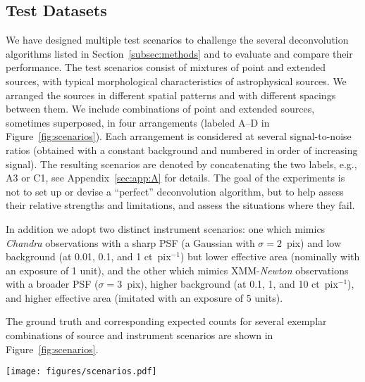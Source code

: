\documentclass[twocolumn, linenumbers]{aastex631}
\newcommand{\chandra}{\textit{Chandra}~}
\newcommand{\chandranospace}{\textit{Chandra}}
\newcommand{\xmm}{\textit{XMM}~}
\begin{document}
    \subsection{Test Datasets}
    \label{subsec:test-datasets}
    We have designed multiple test scenarios to challenge the several deconvolution algorithms listed in Section~\ref{subsec:methods} and to evaluate and compare their performance. The test scenarios consist of mixtures of point and extended sources, with typical morphological characteristics of astrophysical sources. We arranged the sources in different spatial patterns and with different spacings between them. We include combinations of point and extended sources, sometimes superposed, in four arrangements (labeled A--D in Figure~\ref{fig:scenarios}). Each arrangement is considered at several signal-to-noise ratios (obtained with a constant background and numbered in order of increasing signal). The resulting scenarios are denoted by concatenating the two labels, e.g., A3 or C1, see Appendix~\ref{sec:app:A} for details.  The goal of the experiments is not to set up or devise a \enquote{perfect} deconvolution algorithm, but to help assess their relative strengths and limitations,
    and assess the situations where they fail.
    
    In addition we adopt two distinct instrument scenarios: one which mimics \textit{Chandra} observations with a sharp PSF (a Gaussian with $\sigma=2$~pix) and low background (at 0.01, 0.1, and 1 ct~pix$^{-1}$) but lower effective area (nominally with an exposure of 1 unit), and the other which mimics XMM-\textit{Newton} observations with a broader PSF ($\sigma=3$~pix), higher background (at 0.1, 1, and 10 ct~pix$^{-1}$), and higher effective area (imitated with an exposure of 5 units).
        
    The ground truth and corresponding expected counts for several exemplar combinations of source and instrument scenarios are shown in Figure~\ref{fig:scenarios}. 
    
    \begin{figure*}
        \centering\texttt{[image: figures/scenarios.pdf]}
        \caption{Illustration of the expected counts for the different source scenarios we used to generate test datasets. The source patterns shown are for the {\sl (A)}  {\tt points}, {\sl (B) {\tt asterism}}, {\sl (C)} {\tt shield}, and {\sl (D)} {\tt spiral} cases (see Section~\ref{sec:app:A}. For the \chandra instrument scenario we convolve the ground truth image with a narrow Gaussian shaped PSF of width $\sigma=2$~pix. For the \xmm scenario we used a Gaussian shaped PSF with a width of $\sigma=6$~pix and an effective area that is five times larger than that of \chandranospace. All images are of size $128{\times}128$ pixels.
        }
        \label{fig:scenarios}
    \end{figure*}
     
\end{document}
